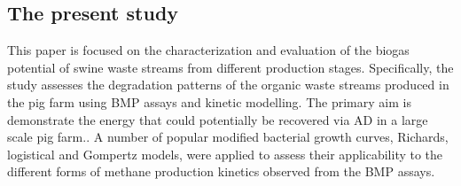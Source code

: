 \subsection{The present study}
This paper is focused on the characterization and evaluation of the biogas potential of swine waste streams from different production stages. Specifically, the study assesses the degradation patterns of the organic waste streams produced in the pig farm using BMP assays and kinetic modelling. The primary aim is demonstrate the energy that could potentially be recovered via AD in a large scale pig farm.. A number of popular modified bacterial growth curves, Richards, logistical and Gompertz models, were applied to assess their applicability to the different forms of methane production kinetics observed from the BMP assays.